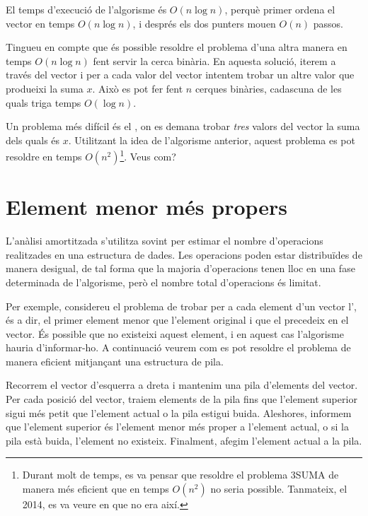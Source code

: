 El temps d'execució de l'algorisme és $O(n \log n)$, perquè primer
ordena el vector en temps $O(n \log n)$, i després els dos punters
mouen $O(n)$ passos.

Tingueu en compte que és possible resoldre el problema d'una altra
manera en temps $O(n \log n)$ fent servir la cerca binària. En aquesta
solució, iterem a través del vector i per a cada valor del vector
intentem trobar un altre valor que produeixi la suma $x$. Això es pot
fer fent $n$ cerques binàries, cadascuna de les quals triga temps
$O(\log n)$.

 Un problema més difícil és el ,
on es demana trobar \emph{tres} valors del vector la suma dels quals és $x$.
Utilitzant la idea de l'algorisme anterior, aquest problema es pot resoldre
en temps $O(n^2)$\footnote{Durant molt de temps, es va pensar que resoldre el
problema 3SUMA de manera més eficient que en temps $O(n^2)$ no seria
possible. Tanmateix, el 2014, es va veure en \cite{gro14} que no era així.}.
Veus com?

\section{Element menor més propers}


L'anàlisi amortitzada s'utilitza sovint per estimar el nombre
d'operacions realitzades en una estructura de dades. Les operacions
poden estar distribuïdes de manera desigual, de tal forma que la
majoria d'operacions tenen lloc en una fase determinada de
l'algorisme, però el nombre total d'operacions és limitat.

Per exemple, considereu el problema de trobar per a cada element d'un
vector l', és a dir, el primer element
menor que l'element original i que el precedeix en el vector. És
possible que no existeixi aquest element, i en aquest cas l'algorisme
hauria d'informar-ho. A continuació veurem com es pot resoldre el
problema de manera eficient mitjançant una estructura de pila.

Recorrem el vector d'esquerra a dreta i mantenim una pila d'elements
del vector. Per cada posició del vector, traiem elements de la pila
fins que l'element superior sigui més petit que l'element actual o la
pila estigui buida. Aleshores, informem que l'element superior és
l'element menor més proper a l'element actual, o si la pila està
buida, l'element no existeix. Finalment, afegim l'element actual a la
pila.

